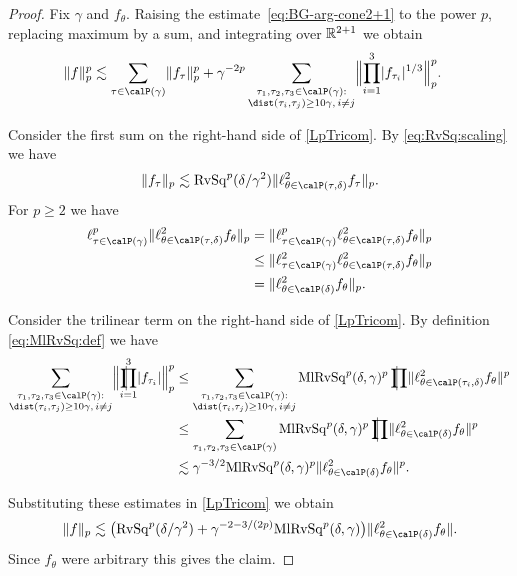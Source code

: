 \begin{proof}
Fix $\gamma$ and $f_{\theta}$.
Raising the estimate~\eqref{eq:BG-arg-cone2+1} to the power $p$, replacing maximum by a sum, and integrating over $\mathbb{R}^{2+1}$ we obtain
\begin{equation} \label{LpTricom}
\begin{split}
\norm{ f }_p^p
&\lesssim \sum_{\tau \in \Part{\gamma}} \norm{ f_{\tau} }_p^p
+ \gamma^{-2p}
\sum_{\substack{\tau_1,\tau_2,\tau_3 \in \Part{\gamma}: \\ \dist(\tau_i, \tau_j) \ge 10\gamma,\, i\neq j}}
\norm[\Big]{ \prod_{i=1}^{3} \abs{f_{\tau_i}}^{1/3} }_p^p.
\end{split}
\end{equation}

Consider the first sum on the right-hand side of \eqref{LpTricom}.
By \eqref{eq:RvSq:scaling} we have
\begin{equation} \label{ppsc}
\norm{ f_\tau }_p
\lesssim \RvSq^{p}(\delta / \gamma^2)
\norm{ \ell^{2}_{\theta\in\Part[\tau]{\delta}} f_{\tau} }_p.
\end{equation}
For $p \ge 2$ we have
\begin{align*}
\ell^{p}_{\tau \in \Part{\gamma}} \norm{ \ell^{2}_{\theta\in\Part[\tau]{\delta}} f_{\theta} }_p
&=
\norm{ \ell^{p}_{\tau \in \Part{\gamma}} \ell^{2}_{\theta\in\Part[\tau]{\delta}} f_{\theta} }_p\\
&\leq
\norm{ \ell^{2}_{\tau \in \Part{\gamma}} \ell^{2}_{\theta\in\Part[\tau]{\delta}} f_{\theta} }_p\\
&=
\norm{ \ell^{2}_{\theta\in\Part{\delta}} f_{\theta} }_p.
\end{align*}

Consider the trilinear term on the right-hand side of \eqref{LpTricom}.
By definition \eqref{eq:MlRvSq:def} we have
\begin{align*}
\sum_{\substack{\tau_1,\tau_2,\tau_3 \in \Part{\gamma}: \\ \dist(\tau_i, \tau_j) \ge 10\gamma,\, i\neq j}}
\norm[\Big]{ \avprod_{i=1}^{3} \abs{f_{\tau_i}} }_p^p
&\leq
\sum_{\substack{\tau_1,\tau_2,\tau_3 \in \Part{\gamma}: \\ \dist(\tau_i, \tau_j) \ge 10\gamma,\, i\neq j}}
\MlRvSq^{p}(\delta,\gamma)^{p} \avprod \norm{\ell^{2}_{\theta\in\Part[\tau_{i}]{\delta}} f_{\theta}}^{p}\\
&\leq
\sum_{\tau_1,\tau_2,\tau_3 \in \Part{\gamma}}
\MlRvSq^{p}(\delta,\gamma)^{p} \avprod \norm{\ell^{2}_{\theta\in\Part{\delta}} f_{\theta}}^{p}\\
&\lesssim
\gamma^{-3/2} \MlRvSq^{p}(\delta,\gamma)^{p} \norm{\ell^{2}_{\theta\in\Part{\delta}} f_{\theta}}^{p}.
\end{align*}

Substituting these estimates in \eqref{LpTricom} we obtain
\[
\norm{f}_p
\lesssim
\bigl( \RvSq^{p}(\delta / \gamma^2) + \gamma^{-2-3/(2p)} \MlRvSq^{p}(\delta,\gamma) \bigr)
\norm{\ell^{2}_{\theta\in\Part{\delta}} f_{\theta}}.
\]
Since $f_{\theta}$ were arbitrary this gives the claim.
\end{proof}

